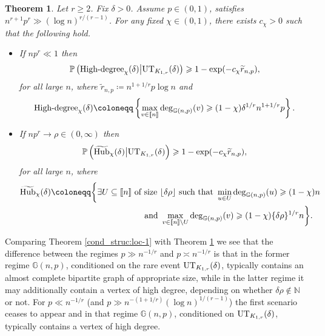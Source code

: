 \documentclass[a4paper,11pt,english,reqno]{amsart}
\numberwithin{equation}{section}
\renewcommand{\geq}{\geqslant}
\newcommand{\N}{\mathbb{N}}
\renewcommand{\P}{\mathbb{P}}
\newcommand{\G}{\mathbb{G}}
\newcommand{\tu}[1]{\textup{#1}}
\newcommand{\set}[1]{[\![#1]\!]}
\newtheorem{theorem}{Theorem}[section]
\newcommand{\cyan}[1]{{\color{cyan} #1}}
\begin{document}
	\begin{theorem}
		\label{cond_struc:star loc-2}
		Let $r\geq 2$. Fix $\delta>0$. Assume $p\in (0,1)$, satisfies $n^{r+1}p^{r}\gg \left(\log n\right)^{r/(r-1)}$. For any fixed $\chi\in (0,1)$, there exists $c_\chi >0$ such that the following hold.
		\begin{itemize}
			\item[(a)] If $np^{r}\ll 1$ then %
			\begin{equation*}
				\P\left(\tu{High-degree}_{\chi}(\delta)\big| \tu{UT}_{K_{1,r}}(\delta)\right)  \geq 1 - \exp(-c_\chi \widetilde{r}_{n,p}),
			\end{equation*}
			for all large $n$, where $\widetilde{r}_{n,p}\coloneqq n^{1+1/r} p \log n$ and
			\begin{equation*}
				\tu{High-degree}_{\chi}(\delta)\coloneqq \left\{\max_{v \in \set{n}} \deg_{\G(n,p)}(v) \geq (1-\chi)\delta^{1/r} n^{1+1/r}p \right\}.
			\end{equation*}
			\item[(b)] If $np^{r}\rightarrow \rho\in (0,\infty)$ then %
			\begin{equation*}
				\P\left(\widetilde{\tu{Hub}}_{\chi}(\delta)\big| \tu{UT}_{K_{1,r}}(\delta)\right) \geq 1-\exp(-c_\chi \widetilde{r}_{n,p}),
			\end{equation*}
			for all large $n$, where 
			\begin{equation*}
				\begin{aligned}
					\widetilde{\tu{Hub}}_{\chi}(\delta)\coloneqq &\bigg\{%
					\exists U\subseteq \set{n}\tu{ of size }\lfloor\delta\rho\rfloor\tu{ such that } \min_{u \in U} \deg_{\G(n,p)}(u) \geq (1-\chi)n\\& \qquad \qquad \qquad  \tu{ and }  \max_{v \in \set{n} \setminus U} \deg_{\G(n,p)}(v) \geq  (1-\chi)\{\delta\rho\}^{1/r}n  \bigg\}.
				\end{aligned}
			\end{equation*}
		\end{itemize}
	\end{theorem}
	
	Comparing Theorem \ref{cond_struc:loc-1} with Theorem \ref{cond_struc:star loc-2} we see that the difference between the regimes $p \gg n^{-1/r}$ and $p \asymp n^{-1/r}$ is that in the former regime $\G(n,p)$, conditioned on the rare event $\tu{UT}_{K_{1,r}}(\delta)$, typically contains an almost complete bipartite graph of appropriate size, while in the latter regime it may additionally contain a vertex of high degree, depending on whether $\delta \rho \notin \N$ or not. For $p \ll n^{-1/r}$ (and $p \gg n^{-(1+1/r)} (\log n)^{1/(r-1)}$) the first scenario ceases to appear and in that regime $\G(n,p)$, conditioned on $\tu{UT}_{K_{1,r}}(\delta)$, typically contains a vertex of high degree.
	
\end{document}
